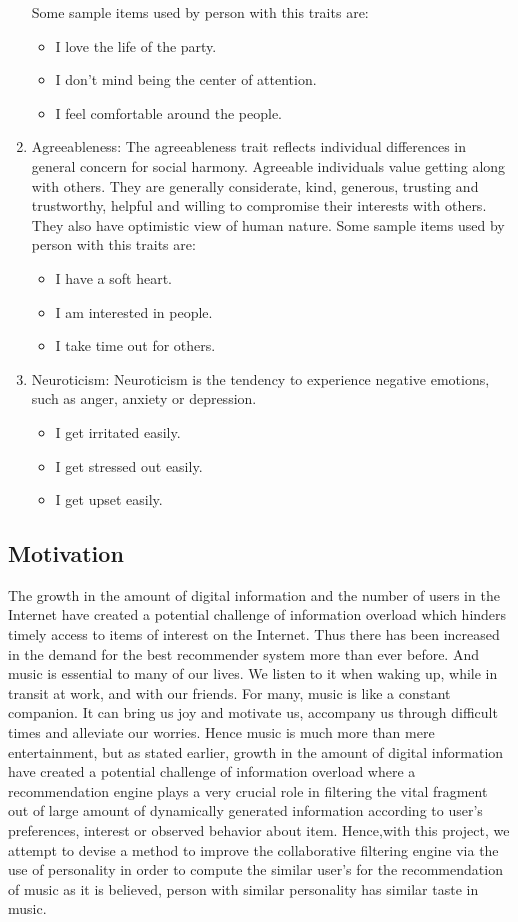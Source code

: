 \begin{enumerate}
Some sample items used by person with this traits are:
\begin{itemize}
	\item I love the life of the party.
	\item I don't mind being the center of attention.
	\item I feel comfortable around the people.
\end{itemize}
\item Agreeableness: The agreeableness trait reflects individual differences in general concern for social harmony. Agreeable individuals value getting along with others. They are generally considerate, kind, generous, trusting and trustworthy, helpful and willing to compromise their interests with others. They also have optimistic view of human nature.
Some sample items used by person with this traits are:
\begin{itemize}
	\item I have a soft heart.
	\item I am interested in people.
	\item I take time out for others.
\end{itemize}
\item Neuroticism: Neuroticism is the tendency to experience negative emotions, such as anger, anxiety or depression.
\begin{itemize}
	\item I get irritated easily.
	\item I get stressed out easily.
	\item I get upset easily.
\end{itemize}
\end{enumerate}
\subsection{Motivation}
The growth in the amount of digital information and the number of users in the Internet have created a potential challenge of information overload which hinders timely access to items of interest on the Internet. Thus there has been increased in the demand for the best recommender system more than ever before. And music is essential to many of our lives. We listen to it when waking up, while in transit at work, and with our friends. For many, music is like a constant companion. It can bring us joy and motivate us, accompany us through difficult times and alleviate our worries. Hence music is much more than mere entertainment, but as stated earlier, growth in the amount of digital information have created a potential challenge of information overload where a recommendation engine plays a very crucial role in filtering the vital fragment out of large amount of dynamically generated information according to user's preferences, interest or observed behavior about item. 
Hence,with this project, we attempt to devise a method to improve the collaborative filtering engine via the use of personality in order to compute the similar user's for the recommendation of music as it is believed, person with similar personality has similar taste in music. 

